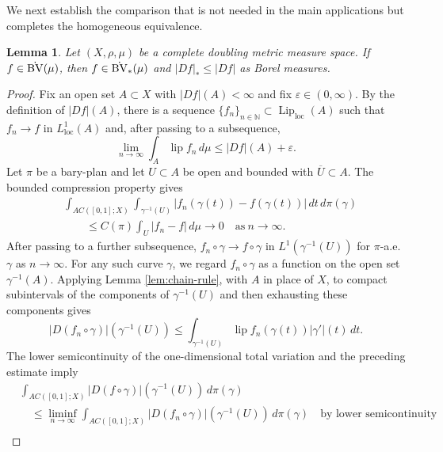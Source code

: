 \documentclass[11pt]{amsart}
\newtheorem{lemma}[theorem]{Lemma}
\theoremstyle{definition}
\theoremstyle{remark}
\numberwithin{equation}{section}
\newcommand{\abs}[1]{|#1|}
\begin{document}
We next establish the comparison that is not needed in the main
applications but completes the homogeneous equivalence.

\begin{lemma}\label{lem:tv-star}
Let $(X,\rho,\mu)$ be a complete doubling metric measure space.  If
$f\in\dot{\rm BV}(\mu)$, then $f\in\dot{\rm BV}_*(\mu)$ and
$|Df|_*\leq |Df|$ as Borel measures.
\end{lemma}

\begin{proof}
Fix an open set $A\subset X$ with $|Df|(A)<\infty$ and
fix $\varepsilon\in(0,\infty)$.  By the definition of $|Df|(A)$, there is
a sequence $\{f_n\}_{n\in\mathbb N}\subset\operatorname{Lip}_{\mathrm{loc}}(A)$
such that $f_n\to f$ in $L^1_{\mathrm{loc}}(A)$ and, after passing to a
subsequence,
\begin{equation}\label{eq:bv-recovery}
 \lim_{n\to\infty}\int_A\operatorname{lip}f_n\,d\mu
 \leq |Df|(A)+\varepsilon.
\end{equation}
Let $\pi$ be a bary-plan and let $U\subset A$ be open and bounded with
$\overline U\subset A$.  The bounded compression property gives
\begin{align*}
 &\int_{AC([0,1];X)}\int_{\gamma^{-1}(U)}
 \abs{f_n(\gamma(t))-f(\gamma(t))}\,dt\,d\pi(\gamma)\\
 &\qquad\leq C(\pi)\int_U\abs{f_n-f}\,d\mu\longrightarrow0\quad\text{as}\ n\to\infty.
\end{align*}
After passing to a further subsequence,
$f_n\circ\gamma\to f\circ\gamma$ in
$L^1(\gamma^{-1}(U))$ for $\pi$-a.e. $\gamma$ as $n\to\infty$.
For any such curve $\gamma$, we regard $f_n\circ\gamma$ as a function on the open set
$\gamma^{-1}(A)$. Applying Lemma \ref{lem:chain-rule}, with $A$ in place of $X$, to compact
subintervals of the components of $\gamma^{-1}(U)$ and then exhausting these components
gives
\begin{equation*}
  |D(f_n\circ\gamma)|(\gamma^{-1}(U))
  \leq\int_{\gamma^{-1}(U)}
  \operatorname{lip}f_n(\gamma(t))\abs{\gamma'}(t)\,dt.
\end{equation*}
The lower semicontinuity of the one-dimensional total variation and the preceding estimate
imply
\begin{align*}
 &\int_{AC([0,1];X)}
 |D(f\circ\gamma)|(\gamma^{-1}(U))\,d\pi(\gamma)\\
 &\quad\leq\liminf_{n\to\infty}
 \int_{AC([0,1];X)} |D(f_n\circ\gamma)|(\gamma^{-1}(U))\,d\pi(\gamma)
 \quad\text{by lower semicontinuity}\\

\end{align*}
\end{proof}
\end{document}
